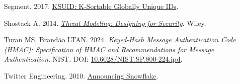 \documentclass[fleqn,10pt]{wlpeerj}
\newlength{\cslhangindent}
\newenvironment{CSLReferences}[2]
 {\begin{list}{}{%
  \setlength{\itemindent}{0pt}
  \setlength{\leftmargin}{0pt}
  \setlength{\parsep}{0pt}
  \ifodd #1
   \setlength{\leftmargin}{\cslhangindent}
   \setlength{\itemindent}{-1\cslhangindent}
  \fi
  \setlength{\itemsep}{#2\baselineskip}}}
 {\end{list}}
\begin{document}
\begin{CSLReferences}{1}{0}
Segment. 2017. \href{https://github.com/segmentio/ksuid}{{KSUID:
K-Sortable Globally Unique IDs}}.

Shostack A. 2014.
\emph{\href{https://www.wiley.com/en-us/Threat+Modeling\%3A+Designing+for+Security-p-9781118809990}{{Threat
Modeling: Designing for Security}}}. Wiley.

Turan MS, Brandão LTAN. 2024. \emph{{Keyed-Hash Message Authentication
Code (HMAC): Specification of HMAC and Recommendations for Message
Authentication}}. NIST. DOI:
\href{https://doi.org/10.6028/NIST.SP.800-224.ipd}{10.6028/NIST.SP.800-224.ipd}.

Twitter Engineering. 2010.
\href{https://github.com/twitter-archive/snowflake}{{Announcing
Snowflake}}.

\end{CSLReferences}
\end{document}
